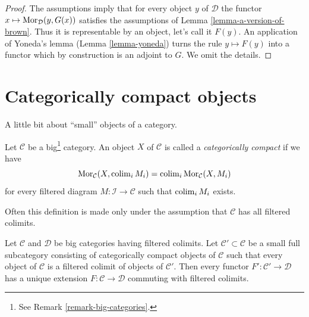 \begin{proof}
The assumptions imply that for every object $y$ of $\mathcal{D}$
the functor $x \mapsto \mathop{\mathrm{Mor}}\nolimits_\mathcal{D}(y, G(x))$ satisfies the
assumptions of Lemma \ref{lemma-a-version-of-brown}.
Thus it is representable by an object, let's call it $F(y)$.
An application of Yoneda's lemma (Lemma \ref{lemma-yoneda})
turns the rule $y \mapsto F(y)$ into a functor which
by construction is an adjoint to $G$. We omit the details.
\end{proof}





\section{Categorically compact objects}
\label{section-compact}

\noindent
A little bit about ``small'' objects of a category.

\begin{definition}
\label{definition-compact-object}
Let $\mathcal{C}$ be a big\footnote{See Remark \ref{remark-big-categories}.}
category. An object $X$ of $\mathcal{C}$ is called a {\it categorically compact}
if we have
$$
\mathop{\mathrm{Mor}}\nolimits_\mathcal{C}(X, \mathop{\mathrm{colim}}\nolimits_i M_i) =
\mathop{\mathrm{colim}}\nolimits_i \mathop{\mathrm{Mor}}\nolimits_\mathcal{C}(X, M_i)
$$
for every filtered diagram $M : \mathcal{I} \to \mathcal{C}$ such that
$\mathop{\mathrm{colim}}\nolimits_i M_i$ exists.
\end{definition}

\noindent
Often this definition is made only under the assumption that $\mathcal{C}$
has all filtered colimits.

\begin{lemma}
\label{lemma-extend-functor-by-colim}
Let $\mathcal{C}$ and $\mathcal{D}$ be big categories having filtered
colimits. Let $\mathcal{C}' \subset \mathcal{C}$ be a small full subcategory
consisting of categorically compact objects of $\mathcal{C}$ such that every
object of $\mathcal{C}$ is a filtered colimit of objects of $\mathcal{C}'$.
Then every functor $F' : \mathcal{C}' \to \mathcal{D}$ has a unique
extension $F : \mathcal{C} \to \mathcal{D}$ commuting with filtered colimits.
\end{lemma}

